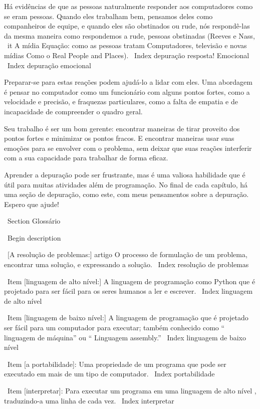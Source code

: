 \documentclass[10pt]{book}
\begin{document}
{Há evidências de que as pessoas naturalmente responder aos computadores como se
eram pessoas. Quando eles trabalham bem, pensamos
deles como companheiros de equipe, e quando eles são obstinados ou rude, nós
respondê-las da mesma maneira como respondemos a rude,
pessoas obstinadas (Reeves e Nass, {\ it A mídia
    Equação: como as pessoas tratam Computadores, televisão e novas mídias
    Como o Real People and Places}).
\ Index {depuração resposta! Emocional}
\ Index {depuração emocional}

Preparar-se para estas reações podem ajudá-lo a lidar com eles.
Uma abordagem é pensar no computador como um funcionário com
alguns pontos fortes, como a velocidade e precisão, e
fraquezas particulares, como a falta de empatia e de incapacidade
de compreender o quadro geral.

Seu trabalho é ser um bom gerente: encontrar maneiras de tirar proveito
dos pontos fortes e minimizar os pontos fracos. E encontrar maneiras
usar suas emoções para se envolver com o problema,
sem deixar que suas reações interferir com a sua capacidade
para trabalhar de forma eficaz.

Aprender a depuração pode ser frustrante, mas é uma valiosa habilidade
que é útil para muitas atividades além de programação. No
final de cada capítulo, há uma seção de depuração, como este,
com meus pensamentos sobre a depuração. Espero que ajude!


\ Section {} Glossário

\ Begin {description}

\ [A resolução de problemas:] artigo O processo de formulação de um problema, encontrar
uma solução, e expressando a solução.
\ Index {} resolução de problemas

\ Item [linguagem de alto nível:] A linguagem de programação como Python que
é projetado para ser fácil para os seres humanos a ler e escrever.
\ Index {linguagem de alto nível}

\ Item [linguagem de baixo nível:] A linguagem de programação que é projetado
ser fácil para um computador para executar; também conhecido como `` linguagem de máquina'' ou
`` Linguagem assembly.''
\ Index {linguagem de baixo nível}

\ Item [a portabilidade]: Uma propriedade de um programa que pode ser executado em mais
de um tipo de computador.
\ Index {} portabilidade

\ Item [interpretar]: Para executar um programa em uma linguagem de alto nível
, traduzindo-a uma linha de cada vez.
\ Index {interpretar}

}
\end{document}
